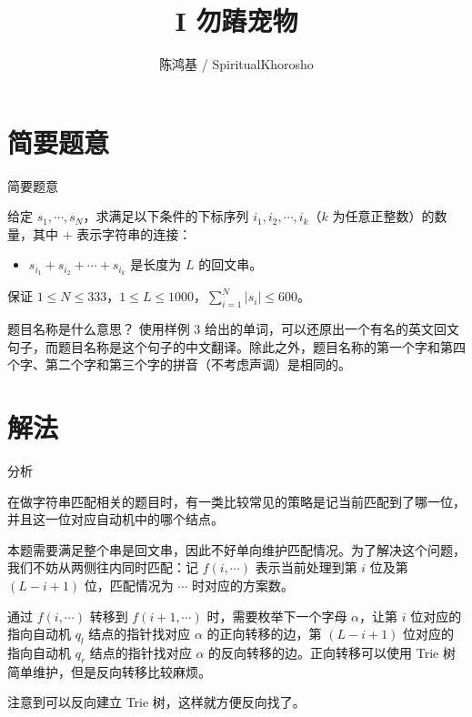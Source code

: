 \documentclass[utf8,usenames,dvipsnames]{beamer}
\author{陈鸿基 / SpiritualKhorosho}
\title{I 勿蹖宠物}
\institute{Tsinghua University}
\begin{document}
\begin{frame}
	\titlepage
\end{frame}

\section{简要题意}

\begin{frame}{简要题意}
	
	给定 $s_1, \cdots, s_N$，求满足以下条件的下标序列 $i_1, i_2, \cdots, i_k$（$k$ 为任意正整数）的数量，其中 $+$ 表示字符串的连接：
	\begin{itemize}
		\item $s_{i_1} + s_{i_2} + \cdots + s_{i_k}$ 是长度为 $L$ 的回文串。
	\end{itemize}

	保证 $1\le N\le 333$，$1\le L\le 1000$，$\sum_{i=1}^N \left|s_i\right| \le 600$。

	\begin{block}{题目名称是什么意思？}
		使用样例 3 给出的单词，可以还原出一个有名的英文回文句子，而题目名称是这个句子的中文翻译。除此之外，题目名称的第一个字和第四个字、第二个字和第三个字的拼音（不考虑声调）是相同的。
	\end{block}

\end{frame}

\section{解法}

\begin{frame}{分析}
	
	在做字符串匹配相关的题目时，有一类比较常见的策略是记当前匹配到了哪一位，并且这一位对应自动机中的哪个结点。

	本题需要满足整个串是回文串，因此不好单向维护匹配情况。为了解决这个问题，我们不妨从两侧往内同时匹配：记 $f(i,\cdots)$ 表示当前处理到第 $i$ 位及第 $(L-i+1)$ 位，匹配情况为 $\cdots$ 时对应的方案数。\pause

	通过 $f(i,\cdots)$ 转移到 $f(i+1,\cdots)$ 时，需要枚举下一个字母 $\alpha$，让第 $i$ 位对应的指向自动机 $q_l$ 结点的指针找对应 $\alpha$ 的正向转移的边，第 $(L-i+1)$ 位对应的指向自动机 $q_r$ 结点的指针找对应 $\alpha$ 的反向转移的边。正向转移可以使用 Trie 树简单维护，但是反向转移比较麻烦。\pause

	注意到可以反向建立 Trie 树，这样就方便反向找了。

\end{frame}
\end{document}
